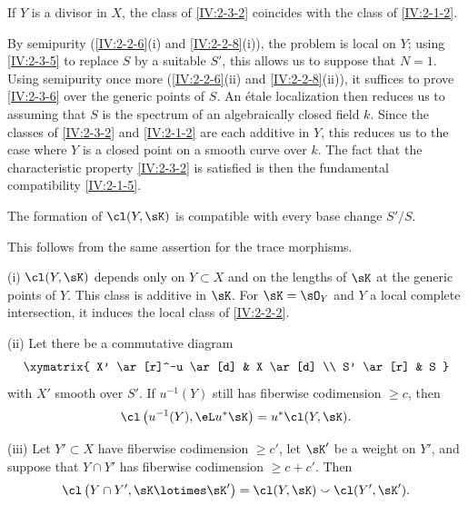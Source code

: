 \documentclass[oneside]{book}
\begin{document}
\begin{lemma}\label{IV:2-3-6}
If $Y$ is a divisor in $X$, the class of \ref{IV:2-3-2} coincides with the
class of \ref{IV:2-1-2}.
\end{lemma}

By semipurity (\ref{IV:2-2-6}(i) and \ref{IV:2-2-8}(i)), the problem is local
on $Y$; using \ref{IV:2-3-5} to replace $S$ by a suitable $S'$, this allows
us to suppose that $N=1$. Using semipurity once more
(\ref{IV:2-2-6}(ii) and \ref{IV:2-2-8}(ii)), it suffices to prove
\ref{IV:2-3-6} over the generic points of $S$. An étale localization then
reduces us to assuming that $S$ is the spectrum of an algebraically closed
field $k$. Since the classes of \ref{IV:2-3-2} and \ref{IV:2-1-2} are each
additive in $Y$, this reduces us to the case where $Y$ is a closed point on a
smooth curve over $k$. The fact that the characteristic property
\ref{IV:2-3-2} is satisfied is then the fundamental compatibility
\ref{IV:2-1-5}.






\begin{lemma}\label{IV:2-3-7}
The formation of $\cl(Y,\sK)$ is compatible with every base change $S'/S$.
\end{lemma}

This follows from the same assertion for the trace morphisms.






\begin{theorem}\label{IV:2-3-8}
(i) $\cl(Y,\sK)$ depends only on $Y\subset X$ and on the lengths of $\sK$ at
the generic points of $Y$. This class is additive in $\sK$. For
$\sK=\sO_Y$ and $Y$ a local complete intersection, it induces the local
class of \ref{IV:2-2-2}.

(ii) Let there be a commutative diagram
\[\xymatrix{
  X' \ar[r]^-u \ar[d]
    & X \ar[d] \\
  S' \ar[r]
    & S
}\]
with $X'$ smooth over $S'$. If $u^{-1}(Y)$ still has fiberwise codimension
$\geqslant c$, then
\[
  \cl\left(u^{-1}(Y),\eL u^\ast\sK\right) = u^\ast \cl(Y,\sK) \text{.}
\]

(iii) Let $Y'\subset X$ have fiberwise codimension $\geqslant c'$, let
$\sK'$ be a weight on $Y'$, and suppose that $Y\cap Y'$ has fiberwise
codimension $\geqslant c+c'$. Then
\[
\cl\left(Y\cap Y',\sK\lotimes \sK'\right) = \cl(Y,\sK) \smallsmile \cl(Y',\sK') \text{.}
\]
\end{theorem}
\end{document}
